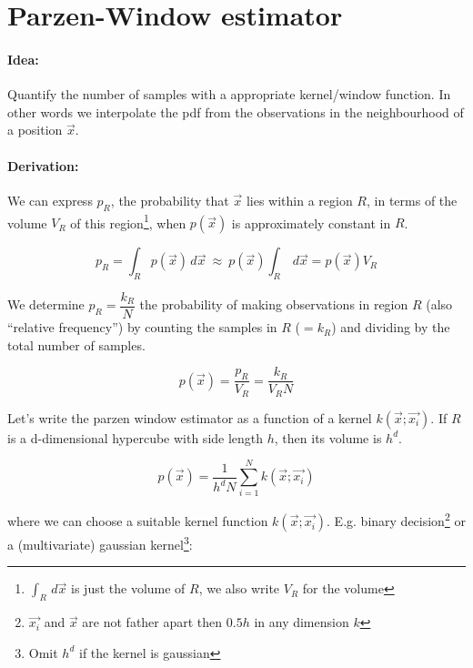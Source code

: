 
\section*{Parzen-Window estimator}
\paragraph{Idea:} Quantify the number of samples with a appropriate kernel/window function. In other words we interpolate
the pdf from the observations in the neighbourhood of a position $\vec{x}$.

\paragraph{Derivation:} We can express $p_R$, the probability that $\vec{x}$ lies within a region $R$, in terms of the volume $V_R$ of this region\footnote{$\int_R \,d\vec{x}$ is just the volume of $R$, we also write $V_R$ for the volume}, when $p(\vec{x})$ is approximately constant in $R$.

\begin{equation*}
  p_R = \int_R p(\vec{x}) \,d\vec{x} \ \approx \ p(\vec{x}) \int_R \,d\vec{x} = p(\vec{x}) V_R
\end{equation*}

We determine $p_R = \dfrac{k_R}{N}$ the probability of making observations in region $R$ (also ``relative frequency'')  by counting the samples in $R$ ($=k_R$) and dividing by the total number of samples.

\begin{equation*}
  p(\vec{x}) = \dfrac{p_R}{V_R} = \dfrac{k_R}{V_R N}
\end{equation*}

Let's write the parzen window estimator as a function of a kernel $k(\vec{x}; \vec{x_i})$. If $R$ is a d-dimensional hypercube with side length $h$, then its volume is $h^d$.

\begin{equation*}
  \boxed{p(\vec{x}) = \dfrac{1}{h^d N} \sum_{i=1}^N k(\vec{x}; \vec{x_i})}
\end{equation*}

where we can choose a suitable kernel function $k(\vec{x}; \vec{x_i})$. E.g. binary decision\footnote{$\vec{x_i}$ and $\vec{x}$ are not father apart then $0.5 h$ in any dimension $k$} or a (multivariate) gaussian kernel\footnote{Omit $h^d$ if the kernel is gaussian}:

